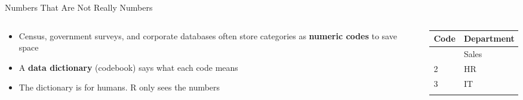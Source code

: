 \documentclass[
  ignorenonframetext,
  aspectratio=169,
]{beamer}
\providecommand{\tightlist}{%
  \setlength{\itemsep}{0pt}\setlength{\parskip}{0pt}}\usepackage{longtable,booktabs,array}
\begin{document}
\begin{frame}{Numbers That Are Not Really Numbers}
\protect\hypertarget{sec-coded}{}
\begin{columns}[T]
\begin{column}{0.55\textwidth}
\begin{itemize}
\tightlist
\item
  Census, government surveys, and corporate databases often store
  categories as \textbf{numeric codes} to save space
\item
  A \textbf{data dictionary} (codebook) says what each code means
\item
  The dictionary is for humans. R only sees the numbers
\end{itemize}
\end{column}

\begin{column}{0.45\textwidth}
\begin{longtable}[]{@{}ll@{}}
\toprule\noalign{}
Code & Department \\
\midrule\noalign{}
\endhead
1 & Sales \\
2 & HR \\
3 & IT \\
\bottomrule\noalign{}
\end{longtable}
\end{column}
\end{columns}
\end{frame}
\end{document}
